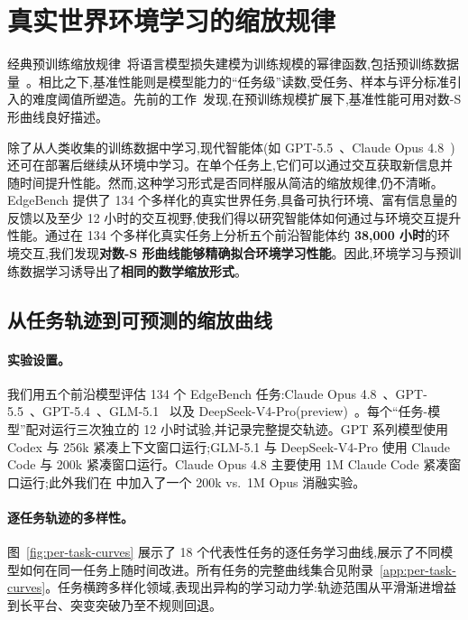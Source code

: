 \section{真实世界环境学习的缩放规律}
\label{sec:scaling}

经典预训练缩放规律~\cite{kaplan2020,hoffmann2022}将语言模型损失建模为训练规模的幂律函数,包括预训练数据量~\cite{kaplan2020,hoffmann2022}。相比之下,基准性能则是模型能力的``任务级''读数,受任务、样本与评分标准引入的难度阈值所塑造。先前的工作~\cite{bhagia2024ladder,owen2024predictable,ruan2024observational,zhang2026prescriptive}发现,在预训练规模扩展下,基准性能可用对数-S 形曲线良好描述。

除了从人类收集的训练数据中学习,现代智能体(如 GPT-5.5~\cite{openai2026gpt55}、Claude Opus 4.8~\cite{anthropic2026opus48})还可在部署后继续从环境中学习。在单个任务上,它们可以通过交互获取新信息并随时间提升性能。然而,这种学习形式是否同样服从简洁的缩放规律,仍不清晰。EdgeBench 提供了 134 个多样化的真实世界任务,具备可执行环境、富有信息量的反馈以及至少 12 小时的交互视野,使我们得以研究智能体如何通过与环境交互提升性能。通过在 134 个多样化真实任务上分析五个前沿智能体约 \textbf{38{,}000 小时}的环境交互,我们发现\textbf{对数-S 形曲线能够精确拟合环境学习性能}。因此,环境学习与预训练数据学习诱导出了\textbf{相同的数学缩放形式}。

\subsection{从任务轨迹到可预测的缩放曲线}
\label{sec:exp-setup}

\paragraph{实验设置。} 我们用五个前沿模型评估 134 个 EdgeBench 任务:Claude Opus 4.8~\cite{anthropic2026opus48}、GPT-5.5~\cite{openai2026gpt55}、GPT-5.4~\cite{openai2026gpt54}、GLM-5.1~\cite{zai2026glm51,glm52026} 以及 DeepSeek-V4-Pro(preview)~\cite{deepseek2026v4}。每个``任务-模型''配对运行三次独立的 12 小时试验,并记录完整提交轨迹。GPT 系列模型使用 Codex 与 256k 紧凑上下文窗口运行;GLM-5.1 与 DeepSeek-V4-Pro 使用 Claude Code 与 200k 紧凑窗口运行。Claude Opus 4.8 主要使用 1M Claude Code 紧凑窗口运行;此外我们在  中加入了一个 200k vs.\ 1M Opus 消融实验。

\paragraph{逐任务轨迹的多样性。} 图~\ref{fig:per-task-curves} 展示了 18 个代表性任务的逐任务学习曲线,展示了不同模型如何在同一任务上随时间改进。所有任务的完整曲线集合见附录~\ref{app:per-task-curves}。任务横跨多样化领域,表现出异构的学习动力学:轨迹范围从平滑渐进增益到长平台、突变突破乃至不规则回退。

